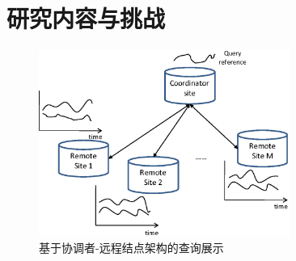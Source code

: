   		                                                                                              

\section{研究内容与挑战}\label{sec-c1-content}
\begin{figure}
	\centering
	\includegraphics[width=0.73\textwidth]{Fig/chapter1/coor-remote}
	\caption{基于协调者-远程结点架构的查询展示}
	\label{fig-chapter1-demonstrate}
\end{figure}

